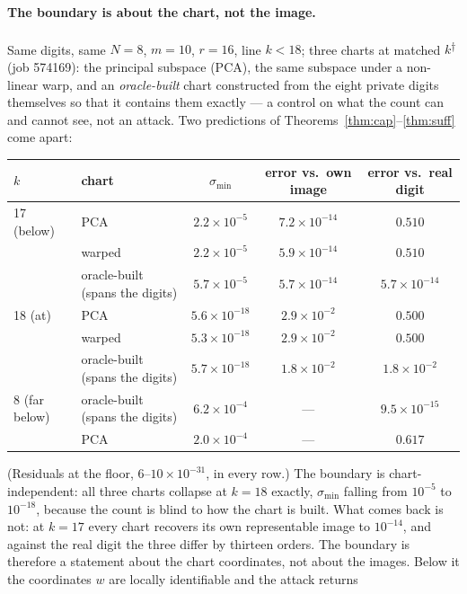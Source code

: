 \paragraph{The boundary is about the chart, not the image.} Same digits,
same $N=8$, $m=10$, $r=16$, line $k<18$; three charts at matched $k$\textsuperscript{$\dagger$}
(job 574169): the principal subspace (PCA), the same subspace under a
non-linear warp, and an \emph{oracle-built} chart constructed from the eight
private digits themselves so that it contains them exactly — a control on
what the count can and cannot see, not an attack. Two predictions of Theorems~\ref{thm:cap}--\ref{thm:suff} come
apart:
\begin{center}\small
\begin{tabular}{@{}llccc@{}}\toprule
$k$ & chart & $\sigma_{\min}$ & error vs.\ own image & error vs.\ real digit\\ \midrule
17 (below) & PCA & $2.2\times10^{-5}$ & $7.2\times10^{-14}$ & $0.510$\\
           & warped & $2.2\times10^{-5}$ & $5.9\times10^{-14}$ & $0.510$\\
           & oracle-built (spans the digits) & $5.7\times10^{-5}$ & $5.7\times10^{-14}$ & $5.7\times10^{-14}$\\
18 (at)    & PCA & $5.6\times10^{-18}$ & $2.9\times10^{-2}$ & $0.500$\\
           & warped & $5.3\times10^{-18}$ & $2.9\times10^{-2}$ & $0.500$\\
           & oracle-built (spans the digits) & $5.7\times10^{-18}$ & $1.8\times10^{-2}$ & $1.8\times10^{-2}$\\
8 (far below) & oracle-built (spans the digits) & $6.2\times10^{-4}$ & --- & $9.5\times10^{-15}$\\
           & PCA & $2.0\times10^{-4}$ & --- & $0.617$\\ \bottomrule
\end{tabular}
\end{center}
(Residuals at the floor, $6$--$10\times10^{-31}$, in every row.) The
boundary is chart-independent: all three charts collapse at $k=18$ exactly,
$\sigma_{\min}$ falling from $10^{-5}$ to $10^{-18}$, because the count is
blind to how the chart is built. What comes back is not: at $k=17$ every
chart recovers its own representable image to $10^{-14}$, and against the
real digit the three differ by thirteen orders. The boundary is therefore a
statement about the chart coordinates, not about the images. Below it the
coordinates $w$ are locally identifiable and the attack returns
